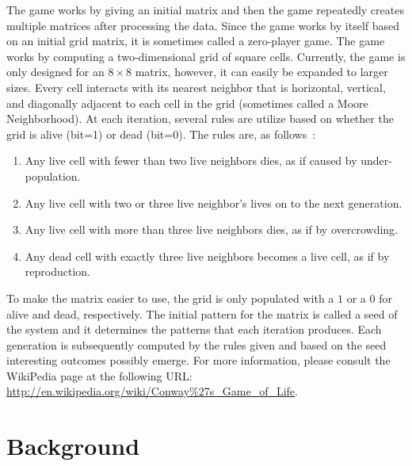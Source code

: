 \documentclass{article}
\begin{document}
The game works by giving an initial matrix and then the game repeatedly creates multiple
matrices after processing the data. Since the game works by itself based on an initial grid matrix,
it is sometimes called a zero-player game. The game works by computing a two-dimensional
grid of square cells. Currently, the game is only designed for an
$8 \times 8$ matrix, however, it can
easily be expanded to larger sizes. Every cell interacts with its nearest neighbor
that is horizontal, vertical, and diagonally adjacent to each cell in
the grid (sometimes called a
Moore Neighborhood). At each iteration, several rules are utilize based on whether the grid is
alive (bit=1) or dead (bit=0). The rules are, as follows~\cite{CleveMolerLife}:
\begin{enumerate}
  \item Any live cell with fewer than two live neighbors dies, as if caused by under-population.
  \item Any live cell with two or three live neighbor’s lives on to the next generation.
  \item Any live cell with more than three live neighbors dies, as if by overcrowding.
  \item Any dead cell with exactly three live neighbors becomes a live
    cell, as if by reproduction.
\end{enumerate}
To make the matrix easier to use, the grid is only populated with a $1$ or a $0$ for alive and dead,
respectively. The initial pattern for the matrix is called a seed of the system and it determines the
patterns that each iteration produces. Each generation is subsequently computed by the rules
given and based on the seed interesting outcomes possibly emerge. For more information, please
consult the WikiPedia page at the following URL:
\url{http://en.wikipedia.org/wiki/Conway%27s_Game_of_Life}.  

\section{Background}
\end{document}
